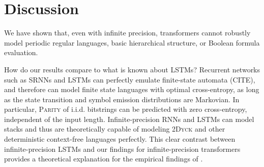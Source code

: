 \documentclass[11pt,a4paper]{article}
\begin{document}



\section{Discussion}

We have shown that, even with infinite precision, transformers cannot robustly model periodic regular languages, basic hierarchical structure, or Boolean formula evaluation.

How do our results compare to what is known about LSTMs?
Recurrent networks such as SRNNs and LSTMs can perfectly emulate finite-state automata (CITE), and therefore can model finite state languages with optimal cross-entropy, as long as the state transition and symbol emission distributions are Markovian.
In particular, \textsc{Parity} of i.i.d. bitstrings can be predicted with zero cross-entropy, independent of the input length.
Infinite-precision RNNs and LSTMs can model stacks \cite{kirov2012processing} and thus are theoretically capable of modeling \textsc{2Dyck} and other deterministic context-free languages perfectly. %
This clear contrast between infinite-precision LSTMs and our findings for infinite-precision transformers provides a theoretical explanation for the empirical findings of \cite{tran2018importance}.





\end{document}

